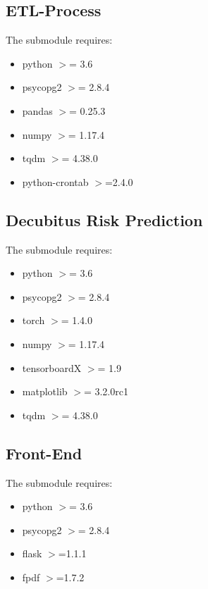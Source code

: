 \subsection{ETL-Process}
The submodule requires:
\begin{itemize}
    \item python $>$= 3.6
    \item psycopg2 $>$= 2.8.4
    \item pandas $>$= 0.25.3
    \item numpy $>$= 1.17.4
    \item tqdm $>$= 4.38.0
    \item python-crontab $>$=2.4.0
\end{itemize}

\subsection{Decubitus Risk Prediction}
The submodule requires:
\begin{itemize}
    \item python $>$= 3.6
    \item psycopg2 $>$= 2.8.4
    \item torch $>$= 1.4.0
    \item numpy $>$= 1.17.4
    \item tensorboardX $>$= 1.9
    \item matplotlib $>$= 3.2.0rc1
    \item tqdm $>$= 4.38.0
\end{itemize}

\subsection{Front-End}
The submodule requires:
\begin{itemize}
    \item python $>$= 3.6
    \item psycopg2 $>$= 2.8.4
    \item flask $>$=1.1.1
    \item fpdf $>$=1.7.2
\end{itemize}